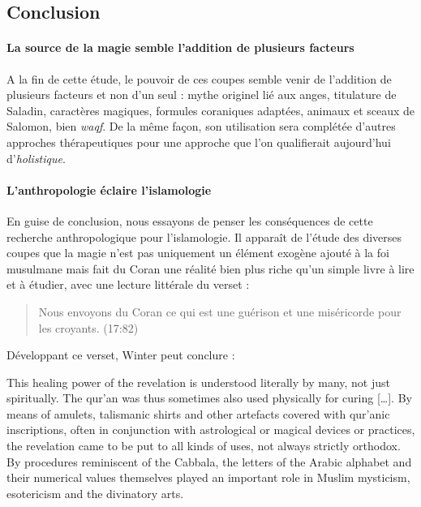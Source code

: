  

 \subsection*{Conclusion}

\paragraph{La source de la magie semble l'addition de plusieurs facteurs } A la fin de cette étude, le pouvoir de ces coupes semble venir de l'addition de plusieurs facteurs et non d'un seul : mythe originel lié aux anges, titulature de Saladin, caractères magiques, formules coraniques adaptées, animaux et sceaux de Salomon, bien \textit{waqf}. 
De la même façon, son utilisation sera complétée d'autres approches thérapeutiques pour une approche que l'on qualifierait aujourd'hui d'\textit{holistique}.

\paragraph{L'anthropologie éclaire l'islamologie} En guise de conclusion, nous essayons de penser les conséquences de cette recherche anthropologique pour l'islamologie. Il apparaît de l'étude des diverses coupes que la magie n'est pas uniquement un élément exogène ajouté  à la foi musulmane mais fait du Coran une réalité bien plus riche qu'un simple livre à lire et à étudier, avec une lecture littérale du verset  : 
\begin{quote}
    Nous envoyons du Coran ce qui est une guérison et une miséricorde pour les croyants. (17:82)
\end{quote}
\vspace{1cm}
Développant ce verset, Winter peut conclure : 
\begin{singlequote}
    This healing
power of the revelation is understood literally by many, not just spiritually.
The qur’an was thus sometimes also used physically for curing [\ldots]. By means of amulets,
talismanic shirts and other artefacts covered with qur’anic inscriptions, often
in conjunction with astrological or magical devices or practices, the revelation
came to be put to all kinds of uses, not always strictly orthodox. By procedures reminiscent of the Cabbala, the letters of the Arabic alphabet and their
numerical values themselves played an important role in Muslim mysticism,
esotericism and the divinatory arts. \cite{winter_cambridge_2008}
\end{singlequote}
 
 
 